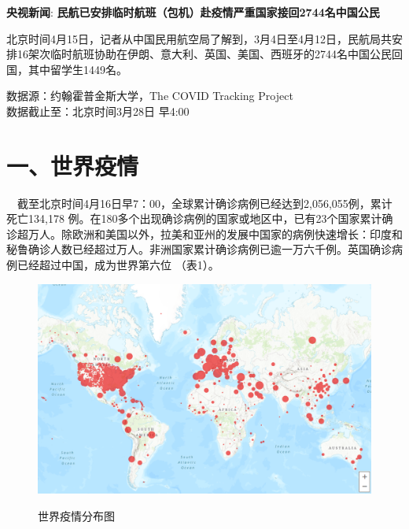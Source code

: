 \documentclass[
]{article}
\begin{document}
\textbf{\textcolor{glaucous}{央视新闻}}:
\textbf{民航已安排临时航班（包机）赴疫情严重国家接回2744名中国公民}

北京时间4月15日，记者从中国民用航空局了解到，3月4日至4月12日，民航局共安排16架次临时航班协助在伊朗、意大利、英国、美国、西班牙的2744名中国公民回国，其中留学生1449名。

\hfill\break

\begin{Large}
{数据源：约翰霍普金斯大学，The COVID Tracking Project \\ 数据截止至：北京时间3月28日 早4:00}
\end{Large}

\hypertarget{section-2}{%
\section{\texorpdfstring{\textcolor{glaucous}{\Huge 一、世界疫情}}{}}\label{section-2}}

\(\quad\)截至北京时间4月16日早7：00，全球累计确诊病例已经达到2,056,055例，累计死亡134,178
例。在180多个出现确诊病例的国家或地区中，已有23个国家累计确诊超万人。除欧洲和美国以外，拉美和亚州的发展中国家的病例快速增长：印度和秘鲁确诊人数已经超过万人。非洲国家累计确诊病例已逾一万六千例。英国确诊病例已经超过中国，成为世界第六位
（表1）。

\begin{figure}[H]
\caption{世界疫情分布图} %
\centering
\includegraphics[]{./input/covid1.png} %
\label{} %
\end{figure}
\end{document}
